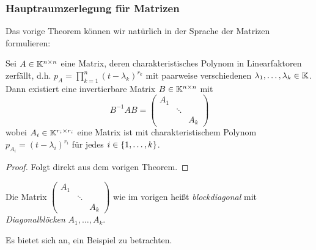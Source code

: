 \subsubsection{Hauptraumzerlegung für Matrizen}

Das vorige Theorem können wir natürlich in der Sprache der Matrizen formulieren:

\begin{thm}
	Sei $ A \in \mathbb K^{n \times n} $ eine Matrix, deren charakteristisches Polynom in Linearfaktoren zerfällt, d.h. $ p_A = \prod_{k=1}^{n} (t - \lambda_k)^{r_k} $ mit paarweise verschiedenen $ \lambda_1, \ldots, \lambda_k \in \mathbb K $. Dann existiert eine invertierbare Matrix $ B \in \mathbb K^{n \times n} $ mit
	\begin{equation*}
		B^{-1}AB = \begin{pmatrix}
			A_1 && \\
			& \ddots & \\
			&& A_k
		\end{pmatrix}
	\end{equation*}
	wobei $ A_i \in \mathbb K^{r_i \times r_i} $ eine Matrix ist mit charakteristischem Polynom $ p_{A_i} = (t-\lambda_i)^{r_i} $ für jedes $ i \in \{ 1,\ldots,k \} $.
\end{thm}
\begin{proof}
	Folgt direkt aus dem vorigen Theorem.
\end{proof}

\noindent Die Matrix $ \begin{pmatrix}
	A_1 && \\
	& \ddots & \\
	&& A_k
\end{pmatrix} $ wie im vorigen heißt \emph{blockdiagonal} mit \emph{Diagonalblöcken} $ A_1, \ldots, A_k $.


Es bietet sich an, ein Beispiel zu betrachten. 

